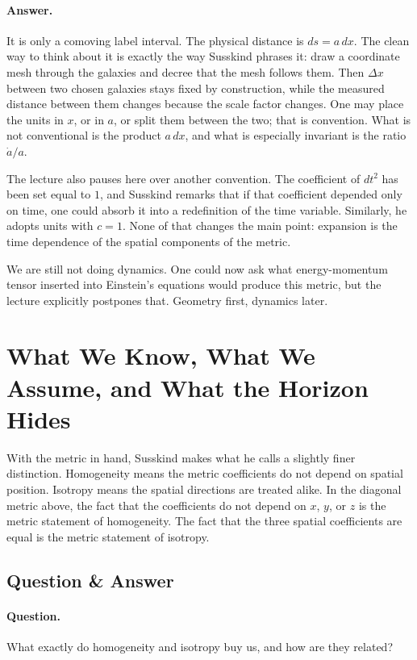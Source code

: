 \paragraph{Answer.} It is only a comoving label interval. The physical distance is \(ds=a\,dx\). The clean way to think about it is exactly the way Susskind phrases it: draw a coordinate mesh through the galaxies and decree that the mesh follows them. Then \(\Delta x\) between two chosen galaxies stays fixed by construction, while the measured distance between them changes because the scale factor changes. One may place the units in \(x\), or in \(a\), or split them between the two; that is convention. What is not conventional is the product \(a\,dx\), and what is especially invariant is the ratio \(\dot a/a\).

The lecture also pauses here over another convention. The coefficient of \(dt^2\) has been set equal to \(1\), and Susskind remarks that if that coefficient depended only on time, one could absorb it into a redefinition of the time variable. Similarly, he adopts units with \(c=1\). None of that changes the main point: expansion is the time dependence of the spatial components of the metric.

We are still not doing dynamics. One could now ask what energy-momentum tensor inserted into Einstein's equations would produce this metric, but the lecture explicitly postpones that. Geometry first, dynamics later.

\section{What We Know, What We Assume, and What the Horizon Hides}

With the metric in hand, Susskind makes what he calls a slightly finer distinction. Homogeneity means the metric coefficients do not depend on spatial position. Isotropy means the spatial directions are treated alike. In the diagonal metric above, the fact that the coefficients do not depend on \(x\), \(y\), or \(z\) is the metric statement of homogeneity. The fact that the three spatial coefficients are equal is the metric statement of isotropy.

\subsection{Question \& Answer}

\paragraph{Question.} What exactly do homogeneity and isotropy buy us, and how are they related?

